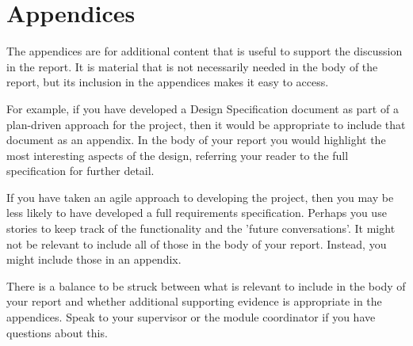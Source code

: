 \documentclass[11pt,a4paper]{report}
\begin{document}




\pagestyle{empty}




\pagestyle{fancy}
\fancyhead{}
\fancyfoot[C]{\thepage}
\renewcommand{\headrulewidth}{0 pt}
\renewcommand{\chaptermark}[1]{\markboth{#1}{}}

\tableofcontents
\newpage
\listoffigures
\newpage
\listoftables
\newpage


\setchapterheaderfooter





\setemptyheader
{}
\chapter*{Appendices}
The appendices are for additional content that is useful to support the discussion in the report. It is material that is not necessarily needed in the body of the report, but its inclusion in the appendices makes it easy to access.

For example, if you have developed a Design Specification document as part of a plan-driven approach for the project, then it would be appropriate to include that document as an appendix. In the body of your report you would highlight the most interesting aspects of the design, referring your reader to the full specification for further detail.

If you have taken an agile approach to developing the project, then you may be less likely to have developed a full requirements specification. Perhaps you use stories to keep track of the functionality and the 'future conversations'. It might not be relevant to include all of those in the body of your report. Instead, you might include those in an appendix.

There is a balance to be struck between what is relevant to include in the body of your report and whether additional supporting evidence is appropriate in the appendices. Speak to your supervisor or the module coordinator if you have questions about this.
\end{document}

